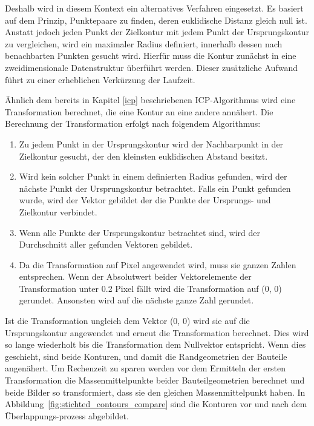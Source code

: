Deshalb wird in diesem Kontext ein alternatives Verfahren eingesetzt. 
Es basiert auf dem Prinzip, Punktepaare zu finden, deren euklidische
Distanz gleich null ist. Anstatt jedoch jeden Punkt der Zielkontur mit 
jedem Punkt der Ursprungskontur zu vergleichen, wird ein maximaler Radius definiert, 
innerhalb dessen nach benachbarten Punkten gesucht wird. Hierfür muss die Kontur 
zunächst in eine zweidimensionale Datenstruktur überführt werden. Dieser zusätzliche 
Aufwand führt zu einer erheblichen Verkürzung der Laufzeit.

Ähnlich dem bereits in Kapitel \ref{icp} beschriebenen ICP-Algorithmus wird eine Transformation 
berechnet, die eine Kontur an eine andere annähert. Die Berechnung der 
Transformation erfolgt nach folgendem Algorithmus:

\begin{enumerate}
    \item Zu jedem Punkt in der Ursprungskontur wird der Nachbarpunkt
    in der Zielkontur gesucht, der den kleinsten euklidischen Abstand besitzt.
    \item Wird kein solcher Punkt in einem definierten Radius gefunden,
    wird der nächste Punkt der Ursprungskontur
    betrachtet. Falls ein Punkt gefunden wurde, wird der Vektor gebildet der die Punkte
    der Ursprungs- und Zielkontur verbindet.
    \item Wenn alle Punkte der Ursprungskontur betrachtet sind, wird der 
    Durchschnitt aller gefunden Vektoren gebildet.
    \item Da die Transformation auf Pixel angewendet wird, muss sie ganzen Zahlen 
    entsprechen. Wenn der Absolutwert beider Vektorelemente der Transformation 
    unter 0.2 Pixel fällt wird die Transformation auf (0, 0) gerundet.
    Ansonsten wird auf die nächste ganze Zahl gerundet.
\end{enumerate}

Ist die Transformation ungleich dem Vektor (0, 0) wird sie auf die Ursprungskontur 
angewendet und erneut die Transformation berechnet. Dies wird so lange wiederholt bis 
die Transformation dem Nullvektor entspricht. Wenn dies geschieht, sind beide Konturen, 
und damit die Randgeometrien der Bauteile angenähert.
Um Rechenzeit zu sparen werden vor dem Ermitteln der ersten Transformation die 
Massenmittelpunkte beider Bauteilgeometrien berechnet und beide Bilder so transformiert, 
dass sie den gleichen Massenmittelpunkt haben.
In Abbildung~\ref{fig:stichted_contours_compare} sind die Konturen vor und nach 
dem Überlappungs-prozess abgebildet.

